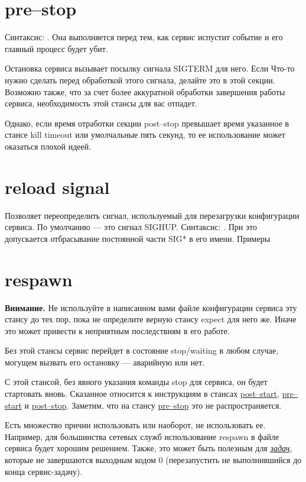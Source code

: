 \section{pre--stop} \label{sec:PreStop}
Синтаксис: . Она выполняется перед тем, как сервис испустит событие  и его главный процесс будет убит.

Остановка сервиса вызывает посылку сигнала SIGTERM для него. Если Что-то нужно сделать перед обработкой этого сигнала, делайте это в этой секции. Возможно также, что за счет более аккуратной обработки завершения работы сервиса, необходимость этой стансы для вас отпадет. 

Однако, если время отработки секции post--stop превышает время указанное в стансе kill timeout или умолчальные пять секунд, то ее использование может оказаться плохой идеей.
\section{reload signal} \label{sec:ReloadSignal}
Позволяет переопределить сигнал, используемый для перезагрузки конфигурации сервиса. По умолчанию --- это сигнал SIGHUP. Синтаксис: . При это допускается отбрасывание постоянной части SIG* в его имени. Примеры \begin{alltt}
\end{alltt}
\section{respawn} \label{sec:respawn}
\textbf{Внимание.} Не используйте в написанном вами файле конфигурации сервиса эту стансу до тех пор, пока не определите верную стансу expect для него же. Иначе это может привести к неприятным последствиям в его работе.

Без этой стансы сервис перейдет в состояние stop/waiting в любом случае, могущем вызвать его остановку --- аварийную или нет.

С этой стансой, без явного указания команды stop для сервиса, он будет стартовать вновь. Сказанное относится к инструкциям в стансах \hyperref[sec:PostStart]{post--start}, \hyperref[sec:PreStart]{pre--start} и \hyperref[sec:PostStop]{post--stop}. Заметим, что на стансу \hyperref[sec:PreStop]{pre--stop} это не распространяется.

Есть множество причин использовать или наоборот, не использовать ее. Например, для большинства сетевых служб использование respawn в файле сервиса будет хорошим решением. Также, это может быть полезным для \hyperref[sec:Task]{\it задач}, которые не завершаются выходным кодом 0 (перезапустить не выполнившийся до конца сервис-задачу).

